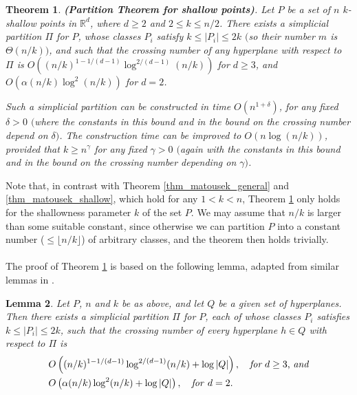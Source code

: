 \documentclass[11pt]{article}
\newtheorem{theorem}{Theorem}[section]
\newtheorem{lemma}[theorem]{Lemma}
\def\reals{\mathbb R}
\begin{document}
\begin{theorem} \label{thm_partition}
\emph{{\bf(Partition Theorem for shallow points)}}.
Let $P$ be a set of $n$ $k$-shallow points in $\reals^d$, where $d \geq 2$ and $2\leq k \leq n/2$. There exists a simplicial partition $\Pi$ for $P$, whose classes $P_{i}$ satisfy $k \leq \left| P_{i} \right| \leq 2k$ $($so their number $m$ is $\Theta(n/k))$, and such that the crossing number of any hyperplane with respect to $\Pi$ is $O\left((n/k)^{1-1/(d-1)} \log^{2/(d-1)}(n/k)\right)$ for $d \geq 3$, and $O\left(\alpha(n/k)\log^{2}(n/k)\right)$ for $d = 2$.

Such a simplicial partition can be constructed in time $O(n^{1+\delta})$, for any fixed $\delta > 0$ $($where the constants in this bound and in the bound on the crossing number depend
on $\delta)$. The construction time can be improved to $O(n \log (n/k))$, provided that $k \geq n^{\gamma}$ for any fixed $\gamma > 0$ $($again with the constants in this bound and in the bound on the crossing number depending on $\gamma)$.
\end{theorem}

 Note that, in contrast with Theorem \ref{thm_matousek_general} and \ref{thm_matousek_shallow}, which hold for any $1 < k < n$, Theorem \ref{thm_partition} only holds for the shallowness parameter $k$ of the set $P$.
 We may assume that $n/k$ is larger than some suitable constant, since otherwise we can partition $P$ into a constant number ($\leq \lfloor n/k \rfloor$) of arbitrary classes, and the theorem then holds trivially.


\paragraph{}
The proof of Theorem \ref{thm_partition} is based on the following lemma, adapted from similar lemmas in \cite{mat92a,mat92b}.

\begin{lemma} \label{lemma_partition_Q}
Let $P$, $n$ and $k$ be as above, and let $Q$ be a given set of hyperplanes. Then there exists a simplicial partition $\Pi$ for $P$, each of whose classes $P_{i}$ satisfies $k \leq \left| P_{i} \right| \leq 2k$, such that the crossing number of every hyperplane $h \in Q$ with respect to $\Pi$ is
\begin{align*}
&O\left((n/k)^{1-1/(d-1)} \log^{2/(d-1)}(n/k) + \log |Q|\right), \quad \mbox{{\em for} $d \geq 3$, {\em and}} \\
&O\left(\alpha(n/k)\log^{2}(n/k) + \log |Q|\right), \quad \mbox{\emph{for} $d = 2$}.
\end{align*}
\end{lemma}
\end{document}

